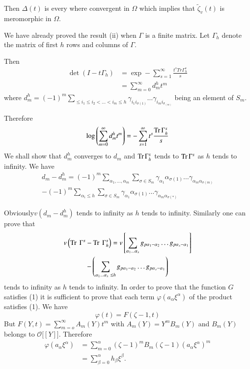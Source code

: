  Then $\Delta (t)$ is every where convergent in $\Omega$ which implies
 that $\tilde{\zeta}_v (t)$ is meromorphic in $\Omega$. 
 
 We have already proved the result (ii)  when $\Gamma$ is a finite
 matrix. Let $\Gamma_h$ denote the matrix of first $h$ rows and columns
 of $\Gamma$. 
 
 Then
 \begin{align*}
   \det ( I-t \Gamma_h ) &= \exp - \sum^{\infty}_{s=1} \frac{t^s Tr
     \Gamma^s_h}{s} \\ 
   &= \sum^{\infty}_{m=0} d^h_m t^m
 \end{align*} 
 where $d^h_m = (-1)^m \sum \limits_{ \leq i_1 \leq i_2 < \ldots < i_m
   \leq h} \gamma_{i_1 i_{\sigma (1)}} \ldots
 \gamma_{i_{m}i_{\sigma_{(m)}}} $ being an element of $S_m$. 
 
 Therefore
 $$
 \log \left( \sum^{\infty}_{m=0} d^h_m t^m \right) = -
 \sum^{\infty}_{s=1} t^s \frac{\operatorname{Tr} \Gamma^s_h}{s} 
 $$
 We shall show that $d^h_m$ converges to $d_m$ and $\operatorname{Tr} \Gamma^s_h$
 tends to $\operatorname{Tr} \Gamma^s $ as $h$ tends to infinity. We have 
 \begin{multline*}
   d_m -d^h_m = (-1)^m \sum_{\alpha_1,\ldots, \alpha_m} \sum_{\sigma \in
     S_m} \gamma_{\alpha_1} \alpha_{\sigma(1)}\ldots \gamma_{\alpha_m
     \alpha_{\sigma (m)}} \\
   -(-1)^m \sum_{\alpha_i \leq h} \sum_{\sigma \in S_m}
   \gamma_{\alpha_{1}} \alpha_{\sigma (1)} \ldots
   \gamma_{\alpha_{m}\alpha_{\sigma (*)}}\qquad  
 \end{multline*}
 
 Obviously\pageoriginale $v(d_m - d_m^h)$ tends to infinity as $h$ tends to
 infinity. Similarly one can prove that  
\begin{multline*}
  v \left(\operatorname{Tr} ~ \Gamma^s-\operatorname{Tr} ~ \Gamma_h^s\right) = v \left[
    \sum_{\alpha_1 \dots \alpha_s}
  g_{p \alpha_1 - \alpha_2} \dots g_{p \alpha_s - \alpha_1} \right] \\
  -\left(\sum_{\alpha_1 \dots \alpha_s ~ \leq h} g_{p \alpha_1 - \alpha_2}
  \dots g_{p \alpha_s - \alpha_1}\right)  
\end{multline*}
tends to infinity as $h$ tends to infinity. In order to prove that the
function $G$ satisfies (1) it is sufficient to prove that each term
$\varphi (a_\alpha \xi^\alpha)$ of the product satisfies (1). We
have 
$$
\varphi(t)= F(\zeta -1, t)
$$
But $F(Y,t)= \sum\limits_{m = o}^\infty A_m (Y) t^m$ with $A_m (Y) =
Y^m B_m (Y)$ and $B_m (Y)$ belongs to $\mathscr{O}\big[
  [Y]\big]$. Therefore  
\begin{align*}
  \varphi (a_\alpha \xi^\alpha) &= \sum_{m=0}^\alpha (\zeta - 1)^m B_m
  (\zeta -1) (a_\alpha \xi^\alpha)^m\\ 
  &= \sum_{\beta=0}^\alpha h_\beta \xi^\beta. 
\end{align*}

